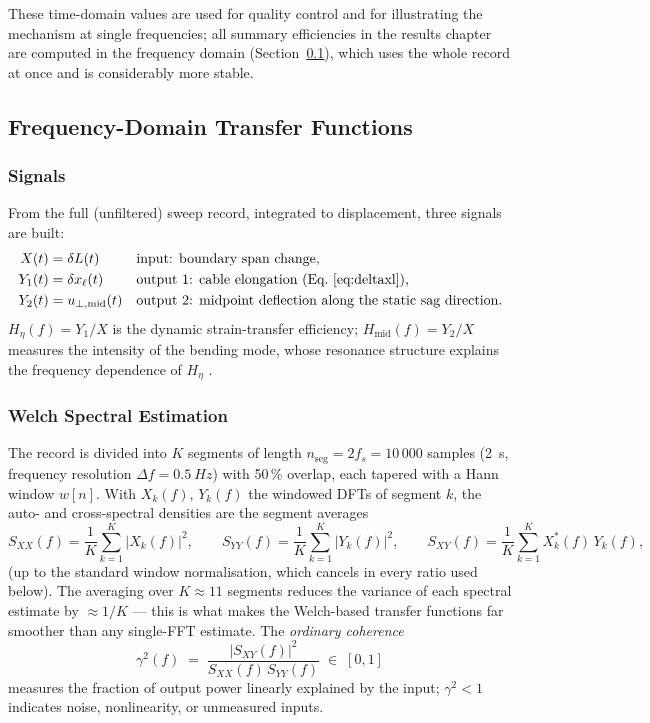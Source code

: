These time-domain values are used for quality control and for illustrating
the mechanism at single frequencies; all summary efficiencies in the results
chapter are computed in the frequency domain
(Section~\ref{sec:proc:freqdomain}), which uses the whole record at once and
is considerably more stable.

\subsection{Frequency-Domain Transfer Functions}
\label{sec:proc:freqdomain}

\subsubsection{Signals}
From the full (unfiltered) sweep record, integrated to displacement, three
signals are built:
\begin{align}
  X(t) &= \delta L(t) && \text{input: boundary span change,} \notag\\
  Y_1(t) &= \delta x_\ell(t) && \text{output 1: cable elongation
                                (Eq.~\ref{eq:deltaxl}),} \notag\\
  Y_2(t) &= u_{\perp,\mathrm{mid}}(t) && \text{output 2: midpoint deflection
                                along the static sag direction.} \notag
\end{align}
$H_\eta(f) = Y_1/X$ is the dynamic strain-transfer efficiency;
$H_\mathrm{mid}(f) = Y_2/X$ measures the intensity of the bending mode, whose
resonance structure explains the frequency dependence of $H_\eta$
\citep{ProbstSimone}.

\subsubsection{Welch Spectral Estimation}
The record is divided into $K$ segments of length
$n_\mathrm{seg} = 2 f_s = 10\,000$ samples (\SI{2}{s}, frequency resolution
$\Delta f = \SI{0.5}{Hz}$) with 50\,\% overlap, each tapered with a Hann
window $w[n]$. With $X_k(f)$, $Y_k(f)$ the windowed DFTs of segment $k$,
the auto- and cross-spectral densities are the segment averages
\begin{equation}
  S_{XX}(f) = \frac{1}{K}\sum_{k=1}^{K} |X_k(f)|^2 , \qquad
  S_{YY}(f) = \frac{1}{K}\sum_{k=1}^{K} |Y_k(f)|^2 , \qquad
  S_{XY}(f) = \frac{1}{K}\sum_{k=1}^{K} X_k^*(f)\, Y_k(f),
  \label{eq:welch}
\end{equation}
(up to the standard window normalisation, which cancels in every ratio used
below). The averaging over $K \approx 11$ segments reduces the variance of
each spectral estimate by $\approx 1/K$ — this is what makes the Welch-based
transfer functions far smoother than any single-FFT estimate. The
\emph{ordinary coherence}
\begin{equation}
  \gamma^2(f) \;=\; \frac{|S_{XY}(f)|^2}{S_{XX}(f)\, S_{YY}(f)}
  \;\in\; [0, 1]
  \label{eq:coherence}
\end{equation}
measures the fraction of output power linearly explained by the input;
$\gamma^2 < 1$ indicates noise, nonlinearity, or unmeasured inputs.

